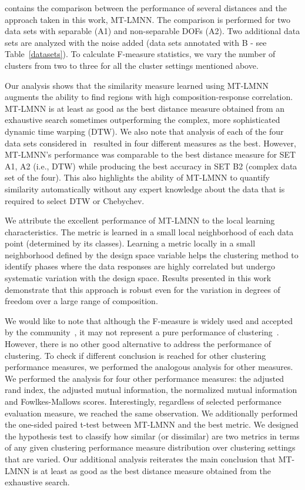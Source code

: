  contains the comparison between the performance of several distances and the approach taken in this work, MT-LMNN. 
The comparison is performed for two data sets with separable (A1) and non-separable DOFs (A2). 
Two additional data sets are analyzed with the noise added (data sets annotated with B - see Table~\ref{datasets}). To calculate F-measure statistics, we vary the number of clusters from two to three for all the cluster settings mentioned above.  

Our analysis shows that the similarity measure learned using MT-LMNN augments the ability to find regions with high composition-response correlation.
MT-LMNN is at least as good as the best distance measure obtained from an exhaustive search sometimes outperforming the complex, more sophisticated dynamic time warping (DTW). %
We also note that analysis of each of the four data sets considered in~ resulted in four different measures as the best. However, MT-LMNN's performance was comparable to the best distance measure for SET A1, A2 (i.e., DTW) while producing the best accuracy in SET B2 (complex data set of the four). This also highlights the ability of MT-LMNN to quantify similarity automatically without any expert knowledge about the data that is required to select DTW or Chebychev.

We attribute the excellent performance of MT-LMNN to the local learning characteristics. 
The metric is learned in a small local neighborhood of each data point (determined by its classes). Learning a metric locally in a small neighborhood defined by the design space variable helps the clustering method to identify phases where the data responses are highly correlated but undergo systematic variation with the design space.
Results presented in this work demonstrate that this approach is robust even for the variation in degrees of freedom over a large range of composition. 

We would like to note that although the F-measure is widely used and accepted by the community~\cite{manning2010introduction}, it may not represent a pure performance of clustering~\cite{powers2015f}. However, there is no other good alternative to address the performance of clustering. 
To check if different conclusion is reached for other clustering performance measures, we performed the analogous analysis for other measures. 
We performed the analysis for four other performance measures: the adjusted rand index, the adjusted mutual information, the normalized mutual  information and Fowlkes-Mallows scores. 
Interestingly, regardless of selected performance evaluation measure, we reached the same observation. 
We additionally performed the one-sided paired t-test between MT-LMNN and the best metric.
We designed the hypothesis test to classify how similar (or dissimilar) are two metrics in terms of any given clustering performance measure distribution over clustering settings that are varied.  
Our additional analysis reiterates the main conclusion that MT-LMNN is at least as good as the best distance measure obtained from the exhaustive search.

